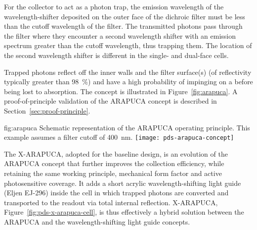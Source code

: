 For the collector to act as a photon trap, the emission wavelength of the wavelength-shifter deposited on the outer face of the dichroic filter must be less than the cutoff wavelength of the filter. 
The transmitted photons pass through the filter where they encounter a second wavelength shifter %
with an emission spectrum greater than the cutoff wavelength, thus trapping them. The location of the second wavelength shifter is different in the single- and dual-face cells. 

Trapped photons reflect off the inner walls and the filter surface(s) (of reflectivity typically greater than \SI{98}{\%}) 
and have a high probability %
of impinging on a  before being lost to absorption. The concept is illustrated in Figure~\ref{fig:arapuca}. 
 A proof-of-principle validation of the ARAPUCA concept is described in Section~\ref{sec:proof-principle}.

\begin{dunefigure}{fig:arapuca}
{Schematic representation of the ARAPUCA operating principle. This example assumes a filter cutoff of \SI{400}{nm}.}
\texttt{[image: pds-arapuca-concept]}   
\end{dunefigure}

The X-ARAPUCA, adopted for the baseline design, is an evolution of the ARAPUCA concept that further improves the collection efficiency, while retaining the same working principle, mechanical form factor and active photosensitive coverage. It adds a 
short acrylic wavelength-shifting light guide (Eljen EJ-296) inside the cell in which trapped photons are converted and transported to the readout via total internal reflection. 
X-ARAPUCA, Figure~\ref{fig:pds-x-arapuca-cell},  is thus effectively a hybrid solution between the ARAPUCA and the wavelength-shifting light guide concepts. 

